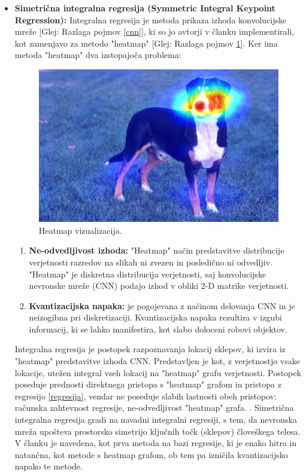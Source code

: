 \documentclass[a4paper,twoside,openright,12pt,slovene]{book}
\begin{document}
    \begin{itemize}
        \item  \textbf{Simetrična integralna regresija (Symmetric Integral Keypoint Regression):} Integralna regresija je metoda prikaza izhoda konvolucijske mreže [Glej: Razlaga pojmov \ref{cnn}], ki so jo avtorji v članku \cite{regart} implementirali, kot zamenjavo za metodo "heatmap" [Glej: Razlaga pojmov \ref{heatmap}]. Ker ima metoda "heatmap" dva izstopajoča problema:

\begin{figure}[h]
    \centering
    \includegraphics[width=0.75\columnwidth]{Slike/heatmap.jpg}
    \caption{\label{heatmap} Heatmap vizualizacija.}
\end{figure}

        \begin{enumerate}
            \item \textbf{Ne-odvedljivost izhoda:} "Heatmap" način predstavitve distribucije verjetnosti razredov na slikah ni zvezen in posledično ni odvedljiv. "Heatmap" je diskretna distribucija verjetnosti, saj konvolucijske nevronske mreže (CNN) podajo izhod v obliki 2-D matrike verjetnosti. \cite{regart}

            \item \textbf{Kvantizacijska napaka:} je pogojevana z načinom delovanja CNN in je neizogibna pri diskretizaciji. Kvantizacijska napaka rezultira v izgubi informacij, ki se lahko manifestira, kot slabo doloceni robovi objektov. \cite{regart}
        \end{enumerate}
        Integralna regresija je postopek razpoznavanja lokacij sklepov, ki izvira iz "heatmap" predstavitve izhoda CNN. Predstavljen je kot, z verjetnostjo vsake lokacije, utežen integral vseh lokacij na "heatmap" grafu verjetnosti. Postopek poseduje prednosti direktnega pristopa s "heatmap" grafom in pristopa z regresijo \ref{regresija}, vendar ne poseduje slabih lastnosti obeh pristopov: računska zahtevnost regresije, ne-odvedljivost "heatmap" grafa. \cite{regart}. Simetrična integralna regresija gradi na navadni integralni regresiji, s tem, da nevronska mreža upošteva prostorsko simetrijo ključnih točk (sklepov) človeškega telesa. V članku \cite{AlphaPose_clanek} je navedena, kot prva metoda na bazi regresije, ki je enako hitra in natančna, kot metode s heatmap grafom, ob tem pa izničila kvantizacijsko napako te metode.


\end{itemize}
\end{document}
